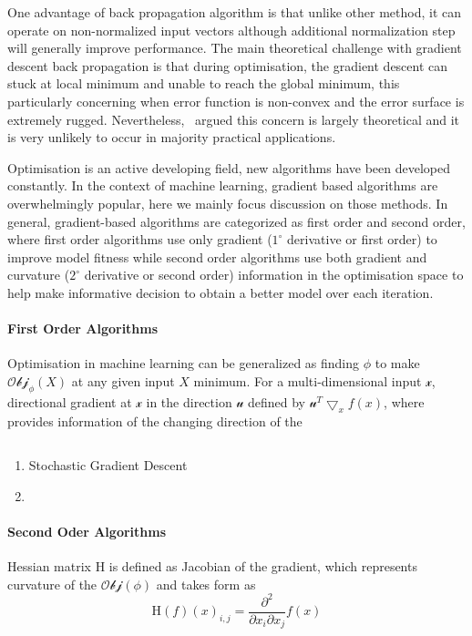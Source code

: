 One advantage of back propagation algorithm is that unlike other method, it can operate on non-normalized input vectors although additional normalization step will generally improve performance. \cite{Buckland:2002} The main theoretical challenge with gradient descent back propagation is that during optimisation, the gradient descent can stuck at local minimum and unable to reach the global minimum, this particularly concerning when error function is non-convex and the error surface is extremely rugged. Nevertheless,~\citet{LeCun_2015} argued this concern is largely theoretical and it is very unlikely to occur in majority practical applications.

Optimisation is an active developing field, new algorithms have been developed constantly. In the context of machine learning, gradient based algorithms are overwhelmingly popular, here we mainly focus discussion on those methods. In general, gradient-based algorithms are categorized as first order and second order, where first order algorithms use only gradient ($1^\circ$ derivative or first order) to improve model fitness while second order algorithms use both gradient and curvature ($2^\circ$ derivative or second order) information in the optimisation space to help make informative decision to obtain a better model over each iteration. \\

\paragraph {First Order Algorithms}
Optimisation in machine learning can be generalized as finding $\phi$ to make $\mathcal{Obj}_{\phi}(X)$ at any given input $X$ minimum. For a multi-dimensional input $\mathcal{x}$, directional gradient at $\mathcal{x}$ in the direction $\mathcal{u}$ defined by $\mathcal{u}^T\bigtriangledown_xf(x)$, where  provides information of the changing direction of the 

\begin{equation}
    
\end{equation}

\begin{enumerate}
    \item Stochastic Gradient Descent \\
    \item \\
\end{enumerate}

\paragraph{Second Oder Algorithms}
Hessian matrix $\mathrm{H}$ is defined as Jacobian of the gradient, which represents curvature of the $\mathcal{Obj}(\phi)$ and takes form as 
\begin{equation}
    \mathrm{H}(f)(x)_{i,j} = \frac{\partial^2}{\partial x_i \partial x_j}f(x)
\end{equation}
